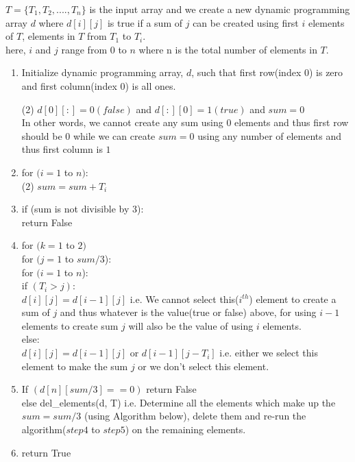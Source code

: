 \documentclass[11pt]{article}
\begin{document}
$T = \{T_1, T_2,...., T_n \}$ is the input array and we create a new dynamic programming array $d$ where $d[i][j]$ is true 
if a sum of $j$ can be created using first $i$ elements of $T$, elements in $T$ from $T_1$ to $T_i$. \\
here, $i$ and $j$ range from $0$ to $n$ where n is the total number of elements in $T$.
\begin{enumerate}
	\item Initialize dynamic programming array, $d$, such that first row(index $0$) is zero and first column(index $0$) is all ones.
	
	\indent (2) $d[0][:] = 0(false)$ and $d[:][0] = 1(true)$ and $sum = 0$ \\
	In other words, we cannot create any sum using 0 elements and thus first row should be $0$ while we can create $sum = 0$ using
	any  number of elements and thus first column is $1$
	\item for $(i = 1$ to $n)$: \\
	\indent (2) $sum = sum + T_i$
	\item if (sum is not divisible by 3): \\
	\indent return False
	\item for $(k = 1$ to $2)$ \\
	\indent for $(j = 1$ to $sum/3$): \\
	\indent \indent for $(i = 1$ to $n$): \\
	\indent \indent \indent if $(T_i > j)$: \\
	\indent \indent \indent \indent $d[i][j] = d[i-1][j]$ i.e. We cannot select this($i^{th}$) element to create a sum of $j$ and 
	thus whatever is the value(true or false) above, for using $i-1$ elements to create sum $j$ will also be the value of using $i$
	elements. \\
	\indent else: \\
	\indent  $d[i][j] = d[i-1][j]$ or $d[i-1][j-T_i]$ i.e. either we select this element to make the sum $j$ or we 
	don't select this element.
	\item If $(d[n][sum/3] == 0)$ return False \\
	\indent else del\_elements(d, T) i.e. Determine all the elements which make up the $sum = sum/3$ (using Algorithm below), delete 
	them and re-run the algorithm($step 4$ to $step 5$) on the remaining elements.
	\item return True
\end{enumerate}
\end{document}
